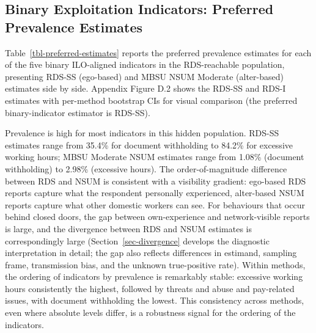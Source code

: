\documentclass[
  12pt,
  letterpaper,
  DIV=11,
  numbers=noendperiod]{scrartcl}
\begin{document}
\subsection{Binary Exploitation Indicators: Preferred Prevalence
Estimates}\label{sec-binary-results}

Table~\ref{tbl-preferred-estimates} reports the preferred prevalence
estimates for each of the five binary ILO-aligned indicators in the
RDS-reachable population, presenting RDS-SS (ego-based) and MBSU NSUM
Moderate (alter-based) estimates side by side. Appendix Figure D.2 shows
the RDS-SS and RDS-I estimates with per-method bootstrap CIs for visual
comparison (the preferred binary-indicator estimator is RDS-SS).

Prevalence is high for most indicators in this hidden population. RDS-SS
estimates range from 35.4\% for document withholding to 84.2\% for
excessive working hours; MBSU Moderate NSUM estimates range from 1.08\%
(document withholding) to 2.98\% (excessive hours). The
order-of-magnitude difference between RDS and NSUM is consistent with a
visibility gradient: ego-based RDS reports capture what the respondent
personally experienced, alter-based NSUM reports capture what other
domestic workers can see. For behaviours that occur behind closed doors,
the gap between own-experience and network-visible reports is large, and
the divergence between RDS and NSUM estimates is correspondingly large
(Section~\ref{sec-divergence} develops the diagnostic interpretation in
detail; the gap also reflects differences in estimand, sampling frame,
transmission bias, and the unknown true-positive rate). Within methods,
the ordering of indicators by prevalence is remarkably stable: excessive
working hours consistently the highest, followed by threats and abuse
and pay-related issues, with document withholding the lowest. This
consistency across methods, even where absolute levels differ, is a
robustness signal for the ordering of the indicators.
\end{document}
